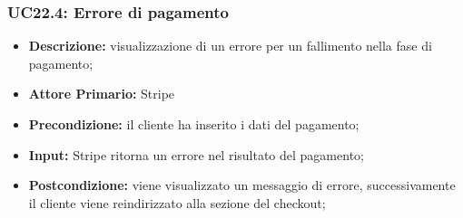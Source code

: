             \subsubsection{UC22.4: Errore di pagamento}
            \label{sec:UC22.4}
                \begin{itemize}
                    \item \textbf{Descrizione:} visualizzazione di un errore per un fallimento nella fase di pagamento;
                    \item \textbf{Attore Primario:} Stripe
                    \item \textbf{Precondizione:} il cliente ha inserito i dati del pagamento;
                    \item \textbf{Input:} Stripe ritorna un errore nel risultato del pagamento;
                    \item \textbf{Postcondizione:} viene visualizzato un messaggio di errore, successivamente il cliente viene reindirizzato alla sezione del checkout;
                \end{itemize}